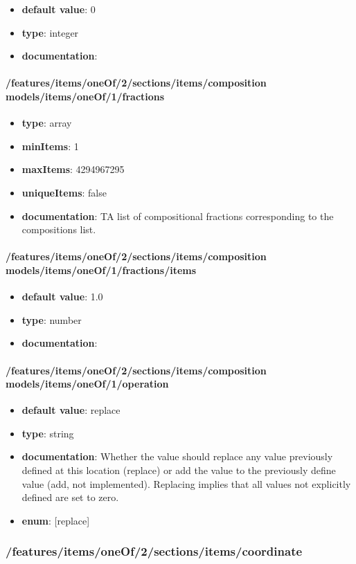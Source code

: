 \begin{itemize}\item {\bf default value}: 0
\item {\bf type}: integer
\item {\bf documentation}: 
\end{itemize}\paragraph{/features/items/oneOf/2/sections/items/composition models/items/oneOf/1/fractions}
\begin{itemize}\item {\bf type}: array
\item {\bf minItems}: 1
\item {\bf maxItems}: 4294967295
\item {\bf uniqueItems}: false
\item {\bf documentation}: TA list of compositional fractions corresponding to the compositions list.
\end{itemize}\paragraph{/features/items/oneOf/2/sections/items/composition models/items/oneOf/1/fractions/items}
\begin{itemize}\item {\bf default value}: 1.0
\item {\bf type}: number
\item {\bf documentation}: 
\end{itemize}\paragraph{/features/items/oneOf/2/sections/items/composition models/items/oneOf/1/operation}
\begin{itemize}\item {\bf default value}: replace
\item {\bf type}: string
\item {\bf documentation}: Whether the value should replace any value previously defined at this location (replace) or add the value to the previously define value (add, not implemented). Replacing implies that all values not explicitly defined are set to zero.
\item {\bf enum}: [replace]\end{itemize}\subsubsection{/features/items/oneOf/2/sections/items/coordinate}
